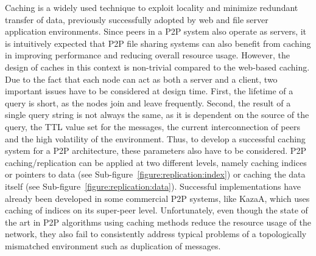 Caching is a widely used technique to exploit locality and minimize redundant
transfer of data, previously successfully adopted by web and file server
application environments. Since peers in a P2P system also operate as servers,
it is intuitively expected that P2P file sharing systems can also benefit from
caching in improving performance and reducing overall resource usage. However,
the design of caches in this context is non-trivial compared to the web-based
caching. Due to the fact that each node can act as both a server and a client,
two important issues have to be considered at design time. First, the lifetime
of a query is short, as the nodes join and leave frequently. Second, the result
of a single query string is not always the same, as it is dependent on the
source of the query, the TTL value set for the messages, the current
interconnection of peers and the high volatility of the environment. Thus,
to develop a successful caching system for a P2P architecture, these
parameters also have to be considered. P2P caching/replication can be applied
at two different levels, namely caching indices or pointers to data (see
Sub-figure~\ref{figure:replication:index}) or caching the data itself (see
Sub-figure~\ref{figure:replication:data}). Successful implementations have
already been developed in some commercial P2P systems, like KazaA, which uses
caching of indices on its super-peer level. Unfortunately, even though the
state of the art in P2P algorithms using caching methods reduce the resource
usage of the network, they also fail to consistently address typical problems
of a topologically mismatched environment such as duplication of messages.

%

